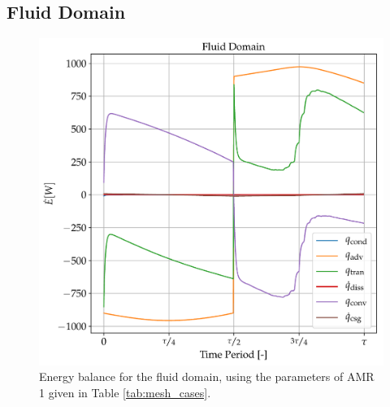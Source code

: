\documentclass[review,preprint,12pt]{elsarticle}
\begin{document}
\subsection{Fluid Domain}

\begin{figure}[!ht]
  \centering
  \includegraphics[scale=0.6]{CE_fluid_1_teste.pdf}
  \caption{Energy balance for the fluid domain, using the parameters of AMR 1 given in Table \ref{tab:mesh_cases}.}
  \label{fig:CE_fluid_1}
\end{figure}
\end{document}
